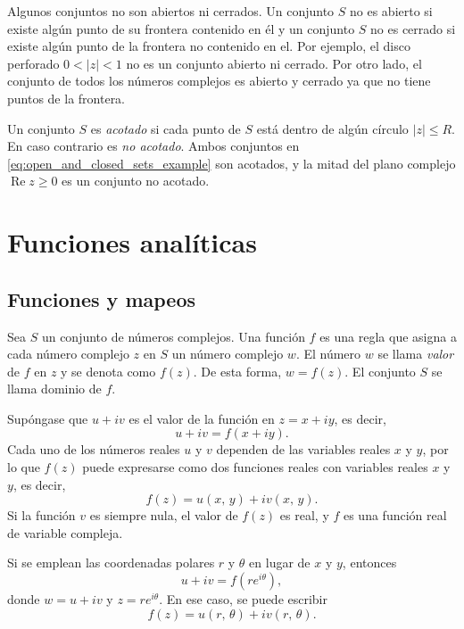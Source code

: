 \documentclass[a4paper]{report}
\renewcommand{\Re}{\operatorname{Re}}
\begin{document}
Algunos conjuntos no son abiertos ni cerrados. Un conjunto \(S\) no es abierto si existe algún punto de su frontera contenido en él y un conjunto \(S\) no es cerrado si existe algún punto de la frontera no contenido en el. Por ejemplo, el disco perforado \(0<|z|<1\) no es un conjunto abierto ni cerrado. Por otro lado, el conjunto de todos los números complejos es abierto y cerrado ya que no tiene puntos de la frontera.  

Un conjunto \(S\) es \emph{acotado} si cada punto de \(S\) está dentro de algún círculo \(|z|\leq R\). En caso contrario es \emph{no acotado}. Ambos conjuntos en \ref{eq:open_and_closed_sets_example} son acotados, y la mitad del plano complejo \(\Re z\geq0\) es un conjunto no acotado.

\chapter{Funciones analíticas}

\section{Funciones y mapeos}

Sea \(S\) un conjunto de números complejos. Una función \(f\) es una regla que asigna a cada número complejo \(z\) en \(S\) un número complejo \(w\). El número \(w\) se llama \emph{valor} de \(f\) en \(z\) y se denota como \(f(z)\). De esta forma, \(w=f(z)\). El conjunto \(S\) se llama dominio de \(f\).

Supóngase que \(u+iv\) es el valor de la función en \(z=x+iy\), es decir,
\[
 u+iv=f(x+iy).
\]
Cada uno de los números reales \(u\) y \(v\) dependen de las variables reales \(x\) y \(y\), por lo que \(f(z)\) puede expresarse como dos funciones reales con variables reales \(x\) y \(y\), es decir,
\[
 f(z)=u(x,\,y)+iv(x,\,y).
\]
Si la función \(v\) es siempre nula, el valor de \(f(z)\) es real, y \(f\) es una función real de variable compleja.

Si se emplean las coordenadas polares \(r\) y \(\theta\) en lugar de \(x\) y \(y\), entonces
\[
 u+iv=f(re^{i\theta}),
\]
donde \(w=u+iv\) y \(z=re^{i\theta}\). En ese caso, se puede escribir
\[
 f(z)=u(r,\,\theta)+iv(r,\,\theta).
\]
\end{document}
